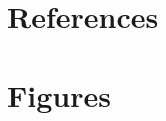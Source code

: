 \documentclass[11pt,a4paper]{article}
\begin{document}
\newpage


\newpage


\newpage


\newpage


\newpage


\appendix

\newpage
\section{References}



\section{Figures}
\end{document}
